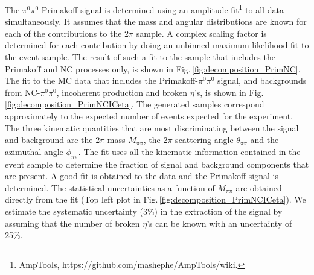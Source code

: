 The $\pi^0\pi^0$ Primakoff signal is determined using an amplitude
fit\footnote{AmpTools, https://github.com/mashephe/AmpTools/wiki.} to
all data simultaneously. It assumes that the mass and angular
distributions are known for each of the contributions to the 2$\pi$
sample. A complex scaling factor is determined for each contribution
by doing an unbinned maximum likelihood fit to the event sample. The
result of such a fit to the sample that includes the Primakoff and NC
processes only, is shown in Fig.\,\ref{fig:decomposition_PrimNC}. The
fit to the MC data that includes the Primakoff-$\pi^0\pi^0$ signal,
and backgrounds from NC-$\pi^0\pi^0$, incoherent production and broken
$\eta$'s, is shown in Fig.\,\ref{fig:decomposition_PrimNCICeta}. The
generated samples correspond approximately to the expected number of
events expected for the experiment. The three kinematic quantities
that are most discriminating between the signal and background are the
2$\pi$ mass $M_{\pi\pi}$, the 2$\pi$ scattering angle
$\theta_{\pi\pi}$ and the azimuthal angle $\phi_{\pi\pi}$. The fit
uses all the kinematic information contained in the event sample to
determine the fraction of signal and background components that are
present. A good fit is obtained to the data and the Primakoff signal
is determined. The statistical uncertainties as a function of
$M_{\pi\pi}$ are obtained directly from the fit (Top left plot in
Fig.\,\ref{fig:decomposition_PrimNCICeta}). We estimate the systematic
uncertainty (3\%) in the extraction of the signal by assuming that the
number of broken $\eta$'s can be known with an uncertainty of 25\%.

